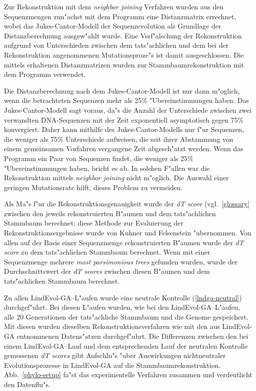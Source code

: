 Zur Rekonstruktion
mit dem \textsl{neighbor joining} Verfahren wurden aus den Sequenzmengen zun"achst mit dem Programm 
eine Distanzmatrix errechnet, wobei das Jukes-Cantor-Modell der Sequenzevolution als Grundlage der Distanzberechnung
ausgew"ahlt wurde. Eine Verf"alschung der Rekonstruktion aufgrund von Unterschieden zwischen dem tats"achlichen und
dem bei der Rekonstruktion angenommenen Mutationsproze"s ist damit ausgeschlossen.
Die mittels  erhaltenen Distanzmatrizen wurden zur
Stammbaumrekonstruktion mit dem Programm  verwendet.

Die Distanzberechnung nach dem Jukes-Cantor-Modell ist nur dann m"oglich, wenn die betrachteten Sequenzen mehr
als 25\% "Ubereinstimmungen haben. Das Jukes-Cantor-Modell sagt voraus, da"s die  Anzahl der Unterschiede zwischen
zwei verwandten DNA-Sequenzen mit der Zeit exponentiell asymptotisch gegen 75\% konvergiert. Daher kann mithilfe
des Jukes-Cantor-Modells nur f"ur Sequenzen, die weniger als 75\% Unterschiede aufweisen, die seit ihrer Abstammung
von einem gemeinsamen Vorfahren vergangene Zeit abgesch"atzt werden. Wenn das Programm  ein
Paar von Sequenzen findet, die weniger als 25\% "Ubereinstimmungen haben, bricht es ab. In solchen F"allen war die
Rekonstruktion mittels \textsl{neighbor joining} nicht m"oglich. Die Auswahl einer geringen Mutationsrate hilft,
dieses Problem zu vermeiden.

Als Ma"s f"ur die Rekonstruktionsgenauigkeit wurde der \textsl{dT score}
(vgl.\ \ref{glossary} zwischen den jeweils rekonstruierten B"aumen und dem tats"achlichen Stammbaum berechnet;
diese Methode zur Evaluierung der Rekonstruktionsergebnisse wurde von Kuhner und Felsenstein \cite{KuhnerFelsenstein}
"ubernommen. Von allen auf der Basis einer Sequenzmenge rekonstruierten B"aumen wurde der \textsl{dT score} zu
dem tats"achlichen Stammbaum berechnet. Wenn mit einer Sequenzmenge mehrere \textsl{most parsimonious trees}
gefunden wurden, wurde der Durchschnittswert der \textsl{dT scores} zwischen diesen B"aumen und dem tats"achlichen
Stammbaum berechnet.

Zu allen LindEvol-GA--L"aufen wurde eine neutrale Kontrolle (\ref{lndga-neutral}) durchgef"uhrt.
Bei diesen L"aufen wurden, wie bei den LindEvol-GA--L"aufen, alle 20 Generationen der tats"achliche Stammbaum
und die Genome gespeichert. Mit diesen  wurden dieselben Rekonstruktionsverfahren 
wie mit den aus LindEvol-GA entnommenen Datens"atzen durchgef"uhrt. Die Differenzen zwischen den bei einem
LindEvol-GA--Lauf und dem entsprechenden Lauf der neutralen Kontrolle gemessenen \textsl{dT scores} gibt
Aufschlu"s "uber Auswirkungen nichtneutraler Evolutionsprozesse in LindEvol-GA auf die Stammbaumrekonstruktion.
Abb.\ \ref{phylo-setup} fa"st das experimentelle Verfahren zusammen und verdeutlicht den Datenflu"s.


